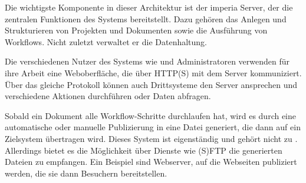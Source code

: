         Die wichtigste Komponente in dieser Architektur ist der imperia Server,
        der die zentralen Funktionen des Systems bereitstellt.
        Dazu gehören das Anlegen und Strukturieren von Projekten
        und Dokumenten sowie die Ausführung von Workflows.
        Nicht zuletzt verwaltet er die Datenhaltung.

        Die verschiedenen Nutzer des Systems wie {\editors} und Administratoren
        verwenden für ihre Arbeit eine Weboberfläche,
        die über HTTP(S) mit dem Server kommuniziert.
        Über das gleiche Protokoll können auch Drittsysteme den Server
        ansprechen und verschiedene Aktionen durchführen oder Daten abfragen.

        Sobald ein Dokument alle Workflow-Schritte durchlaufen hat,
        wird es durch eine automatische oder manuelle Publizierung
        in eine Datei generiert, die dann auf ein Zielsystem übertragen wird.
        Dieses System ist eigenständig und gehört nicht zu {\imperia}.
        Allerdings bietet es die Möglichkeit über Dienste wie (S)FTP
        die generierten Dateien zu empfangen.
        Ein Beispiel sind Webserver, auf die Webseiten publiziert werden,
        die sie dann Besuchern bereitstellen.